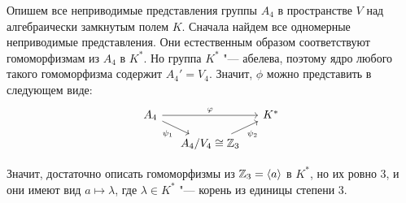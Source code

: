 \begin{note}
	Опишем все неприводимые представления группы $A_4$ в пространстве $V$ над алгебраически замкнутым полем $K$. Сначала найдем все одномерные неприводимые представления. Они естественным образом соответствуют гомоморфизмам из $A_4$ в $K^*$. Но группа $K^*$ "--- абелева, поэтому ядро любого такого гомоморфизма содержит $A_4' = V_4$. Значит, $\phi$ можно представить в следующем виде:
	\[
	\begin{tikzcd}[row sep = small, column sep = small]
		A_4 \arrow[swap]{dr}{\psi_1} \arrow[]{rr}{\phi} && K^*\\
		& A_4 / V_4 \cong \Z_3 \arrow[swap]{ur}{\psi_2}&
	\end{tikzcd}
	\]
	
	Значит, достаточно описать гомоморфизмы из $\mathbb{Z}_3 = \langle a \rangle$ в $K^*$, но их ровно $3$, и они имеют вид $a \mapsto \lambda$, где $\lambda \in K^*$ "--- корень из единицы степени $3$.
	
\end{note}